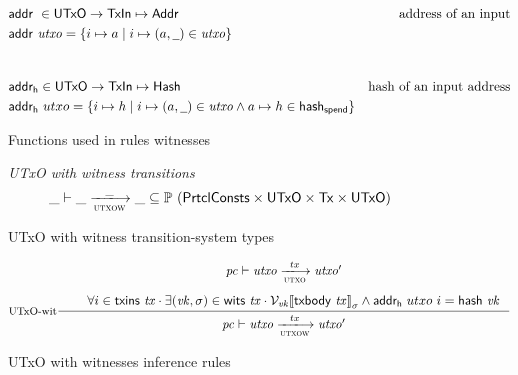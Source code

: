 \begin{figure}
  \begin{align*}
    & \addr{}{} \in \UTxO \to \TxIn \mapsto \Addr & \text{address of an input}\\
    & \addr{utxo} = \{ i \mapsto a \mid i \mapsto (a, \wcard) \in \var{utxo} \} \\
    \nextdef
    & \fun{addr_h} \in \UTxO \to \TxIn \mapsto \Hash & \text{hash of an input address}\\
    & \fun{addr_h}~utxo = \{ i \mapsto h \mid i \mapsto (a, \wcard) \in \var{utxo}
      \wedge a \mapsto h \in \fun{hash_{spend}} \}
  \end{align*}
  \caption{Functions used in rules witnesses}
  \label{fig:derived-defs:utxow}
\end{figure}

\begin{figure}
  \emph{UTxO with witness transitions}
  \begin{equation*}
    \var{\_} \vdash
    \var{\_} \trans{utxow}{\_} \var{\_}
    \subseteq \powerset (\PrtclConsts \times \UTxO \times \Tx \times \UTxO)
  \end{equation*}
  \caption{UTxO with witness transition-system types}
  \label{fig:ts-types:utxow}
\end{figure}

\begin{figure}
  \begin{equation}
    \label{eq:utxo-witness-inductive}
    \inference[UTxO-wit]
    { \var{pc} \vdash \var{utxo} \trans{utxo}{tx} \var{utxo'}\\ ~ \\
      & \forall i \in \txins{tx} \cdot \exists (\var{vk}, \sigma) \in \wits{\var{tx}}
      \cdot
      \mathcal{V}_{\var{vk}}{\serialised{\txbody{tx}}}_{\sigma}
      \wedge  \fun{addr_h}~{utxo}~i = \hash{vk}\\
    }
    {\var{pc} \vdash \var{utxo} \trans{utxow}{tx} \var{utxo'}}
  \end{equation}
  \caption{UTxO with witnesses inference rules}
  \label{fig:rules:utxow}
\end{figure}